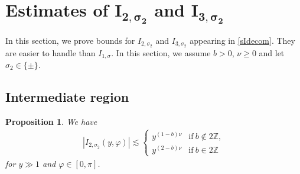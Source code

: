 \documentclass[10pt,a4paper]{article}
\numberwithin{equation}{section}
\newtheorem{Proposition}[Theorem]{Proposition}
 { \theoremstyle{definition}
\newtheorem{Definition}[Theorem]{Definition}
\newtheorem{Note}[Theorem]{Note}
\newtheorem{Example}[Theorem]{Example}
\newtheorem{Remark}[Theorem]{Remark} }
\def\f{\varphi}
\def\n{\nu}
\def\s{\sigma}
\begin{document}
\section[Estimates of I\_\{2,s\_2\} and I\_\{3,s\_2\}]{Estimates of $\boldsymbol{I_{2,\s_2}}$ and $\boldsymbol{I_{3,\s_2}}$ }

In this section, we prove bounds for $I_{2,\s_2}$ and $I_{3,\s_2}$ appearing in \eqref{sIdecom}. They are easier to handle than $I_{1,\s}$. In this section, we assume $b>0$, $\n\geq 0$ and let $\s_2\in \{\pm\}$.

\subsection{Intermediate region}

\begin{Proposition}\label{I_2prop}
We have
\begin{align*}
|I_{2,\s_2}(y,\f)|\lesssim \begin{cases}
y^{(1-b)\n}& \text{if}\  b\notin 2\mathbb{Z}, \\
y^{(2-b)\n}& \text{if}\  b\in 2\mathbb{Z}
\end{cases}
\end{align*}
for $y\gg 1$ and $\f\in [0,\pi]$.
\end{Proposition}
\end{document}

